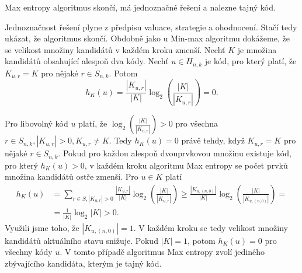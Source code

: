 \begin{tvrz}
    Max entropy algoritmus skončí, má jednoznačné řešení a nalezne tajný kód.
\end{tvrz}
\begin{dukaz}
    Jednoznačnost řešení plyne z předpisu valuace, strategie a ohodnocení. Stačí tedy ukázat, že algoritmus skončí. Obdobně jako u Min-max algoritmu dokážeme, že se velikost množiny kandidátů v každém kroku zmenší. Nechť $K$ je množina kandidátů obsahující alespoň dva kódy. 
    Nechť $u\in H_{n,k}$ je kód, pro který platí, že $K_{u,r} = K$ pro nějaké $r\in S_{n,k}$. Potom 
    \[h_K(u) = \frac{|K_{u,r}|}{|K|}\log_2\left( \frac{|K|}{|K_{u,r}|} \right) = 0.\]
    
    Pro libovolný kód $u$ platí, že $\log_2\left( \frac{|K|}{|K_{u,r}|} \right)  > 0 $ pro všechna $r\in S_{n,k}, |K_{u,r}| > 0, K_{u,r} \neq K$. Tedy $h_K(u) = 0$ právě tehdy, když $K_{u,r} = K$ pro nějaké $r\in S_{n,k}$. Pokud pro každou alespoň dvouprvkovou množinu existuje kód, pro který $h_K(u) > 0$, v každém kroku algoritmu Max entropy se počet prvků množina kandidátů ostře zmenší. Pro $u \in K$ platí
    \begin{align*}
        h_K(u) &= \sum_{r\in S, |K_{u,r}| > 0} \frac{|K_{u,r}|}{|K|}\log_2\left( \frac{|K|}{|K_{u,r}|} \right) 
    \geq 
    \frac{|K_{u,(n,0)}|}{|K|}\log_2\left( \frac{|K|}{|K_{u,(n,0)}|} \right)
    = \\
    &=\frac{1}{|K|} \log_2 |K| > 0.
    \end{align*}
    Využili jsme toho, že $|K_{u,(n,0)}| = 1$. V každém kroku se tedy velikost množiny kandidátů aktuálního stavu snižuje. Pokud $|K| = 1$, potom $h_K(u) = 0$ pro všechny kódy $u$. V tomto případě algoritmus Max entropy zvolí jediného zbývajícího kandidáta, kterým je tajný kód. 
    
\end{dukaz}

